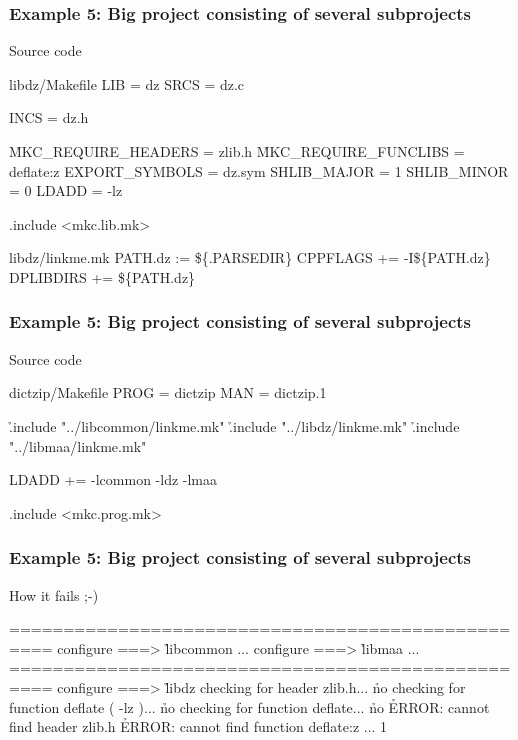 \documentclass[hyperref={colorlinks=true}]{beamer}
\begin{document}
\begin{frame}[fragile]
  \frametitle{Example 5: Big project consisting of several subprojects}

  \begin{block}{Source code}
  \begin{Code}{libdz/Makefile}
LIB =            dz
SRCS =           dz.c

INCS =           dz.h

\h{MKC\_REQUIRE\_HEADERS} =    zlib.h
\h{MKC\_REQUIRE\_FUNCLIBS} =   deflate:z
EXPORT_SYMBOLS =         dz.sym
SHLIB_MAJOR =            1
SHLIB_MINOR =            0
LDADD =                  -lz

.include <mkc.lib.mk>
  \end{Code}
  \begin{Code}{libdz/linkme.mk}
PATH.dz :=       \$\{.PARSEDIR\}
CPPFLAGS +=      -I\$\{PATH.dz\}
DPLIBDIRS +=     \$\{PATH.dz\}
  \end{Code}
  \end{block}
\end{frame}

\begin{frame}[fragile]
  \frametitle{Example 5: Big project consisting of several subprojects}

  \begin{block}{Source code}
  \begin{Code}{dictzip/Makefile}
PROG =   dictzip
MAN =    dictzip.1

\h{.include} "../libcommon/linkme.mk"
\h{.include} "../libdz/linkme.mk"
\h{.include} "../libmaa/linkme.mk"

LDADD +=        -lcommon -ldz -lmaa

.include <mkc.prog.mk>
  \end{Code}
  \end{block}
\end{frame}

\begin{frame}[fragile]
  \frametitle{Example 5: Big project consisting of several subprojects}

  \begin{block}{How it fails ;-)}
  \begin{CodeNoLabel}
==================================================
configure ===> \h{libcommon}
...
configure ===> \h{libmaa}
...
==================================================
configure ===> \h{libdz}
checking for header zlib.h... \h{no}
checking for function deflate ( -lz )... \h{no}
checking for function deflate... \h{no}
\h{ERROR: cannot find header zlib.h}
\h{ERROR: cannot find function deflate:z}
...
1
\prompt{\$}
  \end{CodeNoLabel}
  \end{block}
\end{frame}
\end{document}
